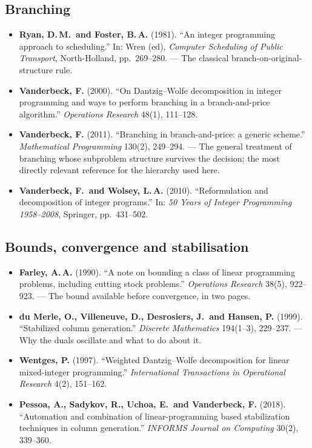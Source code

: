 \documentclass[11pt,a4paper]{article}
\begin{document}
\subsection*{Branching}

\begin{itemize}[leftmargin=1.4em]
\item \textbf{Ryan, D.\,M.\ and Foster, B.\,A.} (1981). ``An integer programming
approach to scheduling.'' In: Wren (ed), \emph{Computer Scheduling of Public
Transport}, North-Holland, pp.\ 269--280. --- The classical
branch-on-original-structure rule.
\item \textbf{Vanderbeck, F.} (2000). ``On Dantzig--Wolfe decomposition in
integer programming and ways to perform branching in a branch-and-price
algorithm.'' \emph{Operations Research} 48(1), 111--128.
\item \textbf{Vanderbeck, F.} (2011). ``Branching in branch-and-price: a generic
scheme.'' \emph{Mathematical Programming} 130(2), 249--294. --- The general
treatment of branching whose subproblem structure survives the decision; the
most directly relevant reference for the hierarchy used here.
\item \textbf{Vanderbeck, F.\ and Wolsey, L.\,A.} (2010). ``Reformulation and
decomposition of integer programs.'' In: \emph{50 Years of Integer Programming
1958--2008}, Springer, pp.\ 431--502.
\end{itemize}

\subsection*{Bounds, convergence and stabilisation}

\begin{itemize}[leftmargin=1.4em]
\item \textbf{Farley, A.\,A.} (1990). ``A note on bounding a class of linear
programming problems, including cutting stock problems.'' \emph{Operations
Research} 38(5), 922--923. --- The bound available before convergence, in two
pages.
\item \textbf{du Merle, O., Villeneuve, D., Desrosiers, J.\ and Hansen, P.}
(1999). ``Stabilized column generation.'' \emph{Discrete Mathematics}
194(1--3), 229--237. --- Why the duals oscillate and what to do about it.
\item \textbf{Wentges, P.} (1997). ``Weighted Dantzig--Wolfe decomposition for
linear mixed-integer programming.'' \emph{International Transactions in
Operational Research} 4(2), 151--162.
\item \textbf{Pessoa, A., Sadykov, R., Uchoa, E.\ and Vanderbeck, F.} (2018).
``Automation and combination of linear-programming based stabilization
techniques in column generation.'' \emph{INFORMS Journal on Computing} 30(2),
339--360.
\end{itemize}
\end{document}
